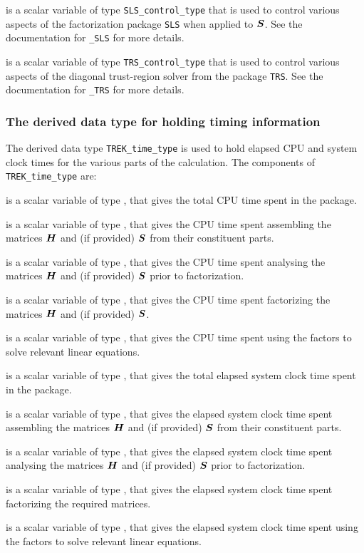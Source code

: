 \documentclass{galahad}
\newcommand{\packagename}{TREK}
\begin{document}
\begin{description}
 is a scalar variable of type
{\tt SLS\_control\_type} that is used to control various aspects of the
factorization package {\tt SLS} when applied to ${\bm{S}}$. See the documentation 
for {\tt \libraryname\_SLS} for more details.

 is a scalar variable of type
{\tt TRS\_control\_type} that is used to control various aspects of the
diagonal trust-region solver from the package {\tt TRS}. See the documentation 
for {\tt \libraryname\_TRS} for more details.

\end{description}


\subsubsection{The derived data type for holding timing
 information}\label{typetime}
The derived data type
{\tt \packagename\_time\_type}
is used to hold elapsed CPU and system clock times for the various parts of
the calculation. The components of
{\tt \packagename\_time\_type}
are:
\begin{description}
 is a scalar variable of type \realdp, that gives
 the total CPU time spent in the package.

 is a scalar variable of type \realdp, that gives
 the CPU time spent assembling the matrices ${\bm{H}}$ and (if provided) ${\bm{S}}$
 from their constituent parts.

 is a scalar variable of type \realdp, that gives
 the CPU time spent analysing the matrices ${\bm{H}}$ and (if provided) ${\bm{S}}$
 prior to factorization.

 is a scalar variable of type \realdp, that gives
 the CPU time spent factorizing the matrices ${\bm{H}}$ and (if provided) ${\bm{S}}$.

 is a scalar variable of type \realdp, that gives
 the CPU time spent using the factors to solve relevant linear equations.

 is a scalar variable of type \realdp, that gives
 the total elapsed system clock time spent in the package.

 is a scalar variable of type \realdp, that gives
 the elapsed system clock time spent assembling the 
 matrices ${\bm{H}}$ and (if provided) ${\bm{S}}$ from their constituent parts.

 is a scalar variable of type \realdp, that gives
 the elapsed system clock time spent analysing the matrices ${\bm{H}}$ and
  (if provided) ${\bm{S}}$ prior to factorization.

 is a scalar variable of type \realdp, that gives
 the elapsed system clock time spent factorizing the required matrices.

 is a scalar variable of type \realdp, that gives
 the elapsed system clock time spent using the factors to solve relevant
linear equations.

\end{description}
\end{document}
